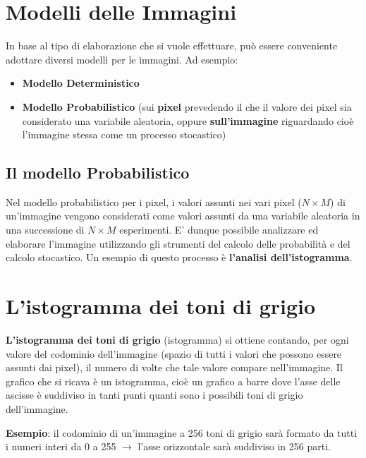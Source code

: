 \section{Modelli delle Immagini}
In base al tipo di elaborazione che si vuole effettuare, può essere conveniente adottare diversi modelli per le immagini. Ad esempio:

\begin{itemize}
    \item \textbf{Modello Deterministico}
    \item \textbf{Modello Probabilistico} (sui \textbf{pixel} prevedendo il che il valore dei pixel sia considerato una variabile aleatoria,
          oppure \textbf{sull'immagine} riguardando cioè l'immagine stessa come un processo stocastico)
\end{itemize}

\subsection{Il modello Probabilistico}

Nel modello probabilistico per i pixel, i valori assunti nei vari pixel ($N × M$) di un’immagine vengono considerati come valori assunti
da una variabile aleatoria in una successione di $N × M$ esperimenti. E’ dunque possibile analizzare ed elaborare l’immagine utilizzando gli strumenti del calcolo delle probabilità e del calcolo stocastico.
Un esempio di questo processo è \textbf{l’analisi dell’istogramma}.

\section{L’istogramma dei toni di grigio}

\textbf{L’istogramma dei toni di grigio} (istogramma) si ottiene contando, per ogni valore del codominio dell’immagine (spazio di tutti i valori
che possono essere assunti dai pixel), il numero di volte che tale valore compare nell’immagine.
Il grafico che si ricava è un istogramma, cioè un grafico a barre dove l’asse delle ascisse è suddiviso in tanti punti quanti sono i
possibili toni di grigio dell’immagine.

\begin{trivlist}
    \item \textbf{Esempio}: il codominio di un’immagine a 256 toni di grigio sarà formato da tutti i numeri interi da 0 a 255 $\rightarrow$ l’asse orizzontale sarà suddiviso in 256 parti.
\end{trivlist}

